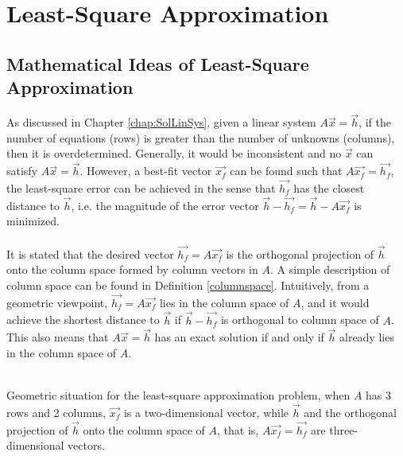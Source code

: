 \chapter{Least-Square Approximation}

\section{Mathematical Ideas of Least-Square Approximation}

As discussed in Chapter \ref{chap:SolLinSys}, given a linear system $A\vec{x} = \vec{h}$, if the number of equations (rows) is greater than the number of unknowns (columns), then it is overdetermined. Generally, it would be inconsistent and no $\vec{x}$ can satisfy $A\vec{x} = \vec{h}$. However, a best-fit vector $\vec{x_f}$ can be found such that $A\vec{x_f} = \vec{h_f}$, the least-square error can be achieved in the sense that $\vec{h_f}$ has the closest distance to $\vec{h}$, i.e. the magnitude of the error vector $\vec{h}-\vec{h_f} = \vec{h}-A\vec{x_f}$ is minimized.\\
\\
It is stated that the desired vector $\vec{h_f} = A\vec{x_f}$ is the orthogonal projection of $\vec{h}$ onto the column space formed by column vectors in $A$. A simple description of column space can be found in Definition \ref{columnspace}. Intuitively, from a geometric viewpoint, $\vec{h_f} = A\vec{x_f}$ lies in the column space of $A$, and it would achieve the shortest distance to $\vec{h}$ if $\vec{h}-\vec{h_f}$ is orthogonal to column space of $A$. This also means that $A\vec{x} = \vec{h}$ has an exact solution if and only if $\vec{h}$ already lies in the column space of $A$.
\begin{center}
 \\
Geometric situation for the least-square approximation problem, when $A$ has 3 rows and 2 columns, $\vec{x_f}$ is a two-dimensional vector, while $\vec{h}$ and the orthogonal projection of $\vec{h}$ onto the column space of $A$, that is, $A\vec{x_f} = \vec{h_f}$ are three-dimensional vectors.
\end{center}

